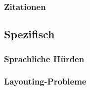 \subsubsection{Zitationen}

\subsection{Spezifisch}
\subsubsection{Sprachliche Hürden}
\subsubsection{Layouting-Probleme}



